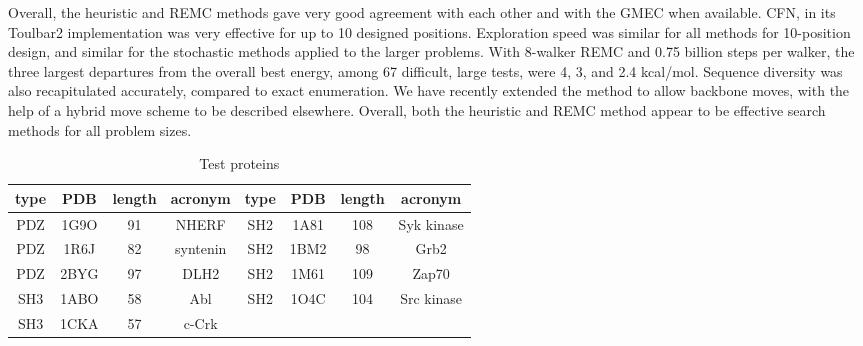 {{Overall, the heuristic and REMC methods gave very good agreement with each other and with the GMEC when available.
CFN, in its Toulbar2 implementation was very effective for up to 10 designed positions. Exploration speed was similar
for all methods for 10-position design, and similar for the stochastic methods applied to the larger problems. With
8-walker REMC and 0.75 billion steps per walker, the three largest departures from the overall best energy, among 67
difficult, large tests, were 4, 3, and 2.4 kcal/mol. Sequence diversity was also recapitulated accurately, compared to
exact enumeration. We have recently extended the method to allow backbone moves, with the help of a hybrid move
scheme to be described elsewhere. Overall, both the heuristic and REMC method appear to be effective search methods
for all problem sizes.

\begin{table}[!htbp]                            
\caption{Test proteins}
\label{tab:proteins}                      
\begin{center}
\begin{tabular}{cccccccc} \hline \hline  
type & PDB  & length & acronym  & type & PDB  & length & acronym \\ \hline
PDZ  & 1G9O &  91    & NHERF    & SH2  & 1A81 & 108    & Syk kinase \\ 
PDZ  & 1R6J &  82    & syntenin & SH2  & 1BM2 &  98    & Grb2       \\
PDZ  & 2BYG &  97    & DLH2     & SH2  & 1M61 & 109    & Zap70      \\
SH3  & 1ABO &  58    & Abl      & SH2  & 1O4C & 104    & Src kinase \\
SH3  & 1CKA &  57    & c-Crk    &      &      &        &     \\ \hline
\end{tabular}
\end{center}
\end{table}


}}
